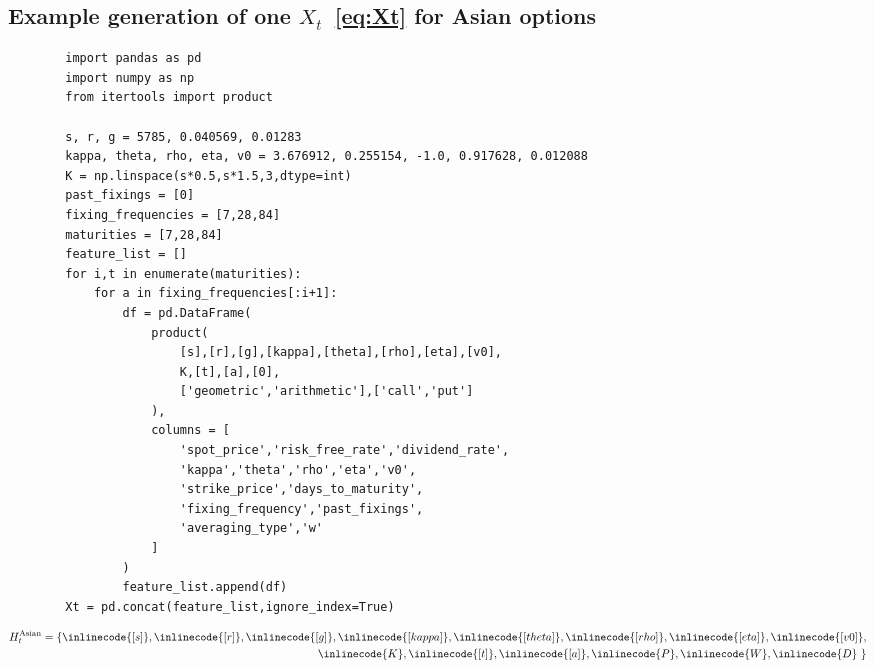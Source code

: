 \subsection{Example generation of one $X_{t}$~\eqref{eq:Xt} for Asian options}
\begin{table}[ht]
	\centering
	\begin{lstlisting}
		import pandas as pd
		import numpy as np
		from itertools import product
		
		s, r, g = 5785, 0.040569, 0.01283
		kappa, theta, rho, eta, v0 = 3.676912, 0.255154, -1.0, 0.917628, 0.012088
		K = np.linspace(s*0.5,s*1.5,3,dtype=int)
		past_fixings = [0]
		fixing_frequencies = [7,28,84]
		maturities = [7,28,84]
		feature_list = []
		for i,t in enumerate(maturities):
			for a in fixing_frequencies[:i+1]:
				df = pd.DataFrame(
					product(
						[s],[r],[g],[kappa],[theta],[rho],[eta],[v0],
						K,[t],[a],[0],
						['geometric','arithmetic'],['call','put']
					),
					columns = [
						'spot_price','risk_free_rate','dividend_rate',
						'kappa','theta','rho','eta','v0',
						'strike_price','days_to_maturity',
						'fixing_frequency','past_fixings',
						'averaging_type','w'
					]
				)
				feature_list.append(df)
		Xt = pd.concat(feature_list,ignore_index=True)
	\end{lstlisting}
\end{table}
\begin{equation}
	\begin{aligned}
		H_{t}^{\text{Asian}} = \{ \inlinecode{[s]}, \inlinecode{[r]}, \inlinecode{[g]}, \inlinecode{[kappa]}, \inlinecode{[theta]}, \inlinecode{[rho]}, \inlinecode{[eta]}, \inlinecode{[v0]}, \\ \inlinecode{K},  \inlinecode{[t]}, \inlinecode{[a]}, \inlinecode{P}, \inlinecode{W}, \inlinecode{D}\ \}
		\label{eq:asianHt}
	\end{aligned}
\end{equation}
